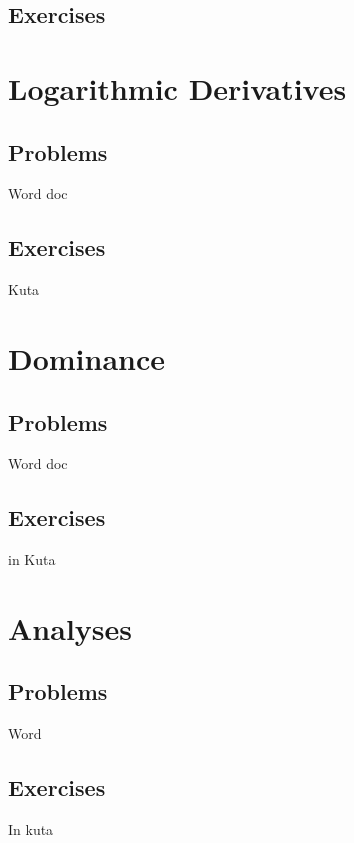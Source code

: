 \subsection{Exercises}


\newpage
\section{Logarithmic Derivatives}
\subsection{Problems}
Word doc
\newpage

\newpage
\subsection{Exercises}
Kuta


\newpage
\section{Dominance}
\subsection{Problems}
Word doc
\newpage

\newpage
\subsection{Exercises}
in Kuta


\newpage
\section{Analyses}
\subsection{Problems}
Word
\newpage

\newpage
\subsection{Exercises}
In kuta




